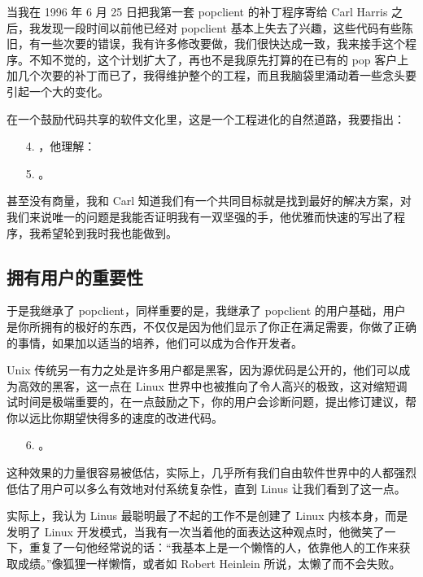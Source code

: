 当我在 1996 年 6 月 25 日把我第一套 popclient 的补丁程序寄给 Carl Harris 之后，我发现一段时间以前他已经对 popclient 基本上失去了兴趣，这些代码有些陈旧，有一些次要的错误，我有许多修改要做，我们很快达成一致，我来接手这个程序。不知不觉的，这个计划扩大了，再也不是我原先打算的在已有的 pop 客户上加几个次要的补丁而已了，我得维护整个的工程，而且我脑袋里涌动着一些念头要引起一个大的变化。


在一个鼓励代码共享的软件文化里，这是一个工程进化的自然道路，我要指出：

\begin{enumerate}
\item[4.] ，他理解：
\item[5.] 。
\end{enumerate}

甚至没有商量，我和 Carl 知道我们有一个共同目标就是找到最好的解决方案，对我们来说唯一的问题是我能否证明我有一双坚强的手，他优雅而快速的写出了程序，我希望轮到我时我也能做到。


\subsection{拥有用户的重要性}


于是我继承了 popclient，同样重要的是，我继承了 popclient 的用户基础，用户是你所拥有的极好的东西，不仅仅是因为他们显示了你正在满足需要，你做了正确的事情，如果加以适当的培养，他们可以成为合作开发者。


Unix 传统另一有力之处是许多用户都是黑客，因为源优码是公开的，他们可以成为高效的黑客，这一点在 Linux 世界中也被推向了令人高兴的极致，这对缩短调试时间是极端重要的，在一点鼓励之下，你的用户会诊断问题，提出修订建议，帮你以远比你期望快得多的速度的改进代码。

\begin{enumerate}
\item[6.] 。
\end{enumerate}

这种效果的力量很容易被低估，实际上，几乎所有我们自由软件世界中的人都强烈低估了用户可以多么有效地对付系统复杂性，直到 Linus 让我们看到了这一点。


实际上，我认为 Linus 最聪明最了不起的工作不是创建了 Linux 内核本身，而是发明了 Linux 开发模式，当我有一次当着他的面表达这种观点时，他微笑了一下，重复了一句他经常说的话：“我基本上是一个懒惰的人，依靠他人的工作来获取成绩。”像狐狸一样懒惰，或者如 Robert Heinlein 所说，太懒了而不会失败。


